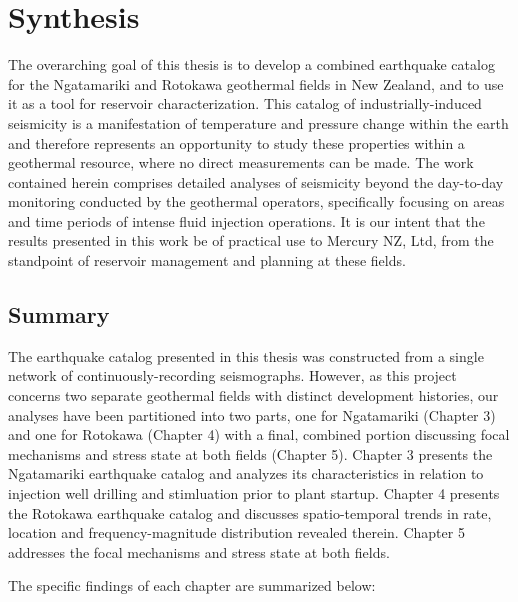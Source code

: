 \chapter{Synthesis}
The overarching goal of this thesis is to develop a combined earthquake catalog for the Ngatamariki and Rotokawa geothermal fields in New Zealand, and to use it as a tool for reservoir characterization. This catalog of industrially-induced seismicity is a manifestation of temperature and pressure change within the earth and therefore represents an opportunity to study these properties within a geothermal resource, where no direct measurements can be made. The work contained herein comprises detailed analyses of seismicity beyond the day-to-day monitoring conducted by the geothermal operators, specifically focusing on areas and time periods of intense fluid injection operations. It is our intent that the results presented in this work be of practical use to Mercury NZ, Ltd, from the standpoint of reservoir management and planning at these fields.

\section{Summary}
The earthquake catalog presented in this thesis was constructed from a single network of continuously-recording seismographs. However, as this project concerns two separate geothermal fields with distinct development histories, our analyses have been partitioned into two parts, one for Ngatamariki (Chapter 3) and one for Rotokawa (Chapter 4) with a final, combined portion discussing focal mechanisms and stress state at both fields (Chapter 5). Chapter 3 presents the Ngatamariki earthquake catalog and analyzes its characteristics in relation to injection well drilling and stimluation prior to plant startup. Chapter 4 presents the Rotokawa earthquake catalog and discusses spatio-temporal trends in rate, location and frequency-magnitude distribution revealed therein. Chapter 5 addresses the focal mechanisms and stress state at both fields.

\begin{flushleft}
The specific findings of each chapter are summarized below:
\end{flushleft}

